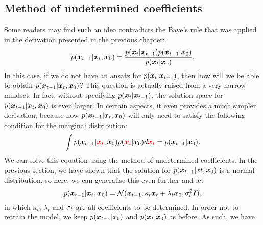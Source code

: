 \subsection{Method of undetermined coefficients}
Some readers may find such an idea contradicts the Baye's rule that was applied in the derivation presented in the previous chapter:
\begin{equation}
    \label{eq:4.2}
    p(\bm{x}_{t-1}|\bm{x}_{t},\bm{x}_0)=\frac{p(\bm{x}_{t}|\bm{x}_{t-1})p(\bm{x}_{t-1}|\bm{x}_0)}{p(\bm{x}_{t}|\bm{x}_0)}.
\end{equation}
In this case, if we do not have an ansatz for $p(\bm{x}_{t}|\bm{x}_{t-1})$, then how will we be able to obtain  $p(\bm{x}_{t-1}|\bm{x}_{t},\bm{x}_0)$? This question is actually raised from a very narrow mindset. In fact, without specifying $p(\bm{x}_{t}|\bm{x}_{t-1})$, the solution space for $p(\bm{x}_{t-1}|\bm{x}_{t},\bm{x}_0)$ is even larger. In certain aspects, it even provides a much simpler derivation, because now $p(\bm{x}_{t-1}|\bm{x}_{t},\bm{x}_0)$ will only need to satisfy the following condition for the marginal distribution:
\begin{equation}
\label{eq:4.3}
    \int p(\bm{x}_{t-1}|\textcolor{red}{\bm{x}_{t}},\bm{x}_0)p(\textcolor{red}{\bm{x}_{t}}|\bm{x}_0)d\textcolor{red}{\bm{x}_{t}}=p(\bm{x}_{t-1}|\bm{x}_0).
\end{equation}
We can solve this equation using the method of undetermined coefficients. In the previous section, we have shown that the solution for $p(\bm{x}_{t-1}|xt,\bm{x}_0)$ is a normal distribution, so here, we can generalise this even further and let
\begin{equation}
    \label{eq:4.4}
    p(\bm{x}_{t-1}|\bm{x}_{t},\bm{x}_0) = \mathcal{N}(\bm{x}_{t-1};\kappa_t\bm{x}_{t}+\lambda_t \bm{x}_0,\sigma_t^2\bm{I}),
\end{equation}
in which $\kappa_t$, $\lambda_t$ and $\sigma_t$ are all coefficients to be determined. In order not to retrain the model, we keep $p(\bm{x}_{t-1}|x_0)$ and $p(\bm{x}_{t}|\bm{x}_0)$ as before. As such, we have
